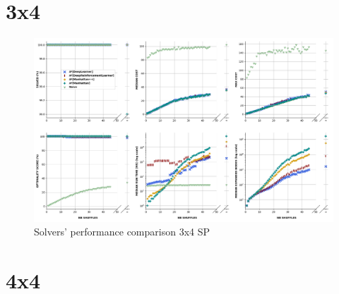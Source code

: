 \section{3x4}

\label{ssec:34SPSC}

\begin{landscape}
\centering\vspace*{\fill}
\begin{figure}[H]
\centering
\includegraphics[scale=0.63]{./Figures/34SPPerformance}
\caption[34SPPerformance]{Solvers' performance comparison 3x4 SP}
\label{fig:34SPPerformance}
\end{figure}
\vfill
\end{landscape}
\restoregeometry

\section{4x4}



\label{ssec:44SPSC}

